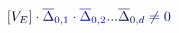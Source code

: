\documentclass[12pt]{article}
\begin{document}
\makeatletter
\renewcommand*{\@textcolor}[3]{%
  \protect\leavevmode
  \begingroup
    \color#1{#2}#3%
  \endgroup
}
\makeatother
\begin{displaymath}
\mathcolor[RGB]{0,0,15}{[} \mathcolor[RGB]{0,0,30}{V} _ { \mathcolor[RGB]{0,0,45}{E} } \mathcolor[RGB]{0,0,60}{]} \mathcolor[RGB]{0,0,75}{\cdot} {\mathcolor[RGB]{0,0,90}{\overline { \mathcolor[RGB]{0,0,105}{\Delta} } }} _ { \mathcolor[RGB]{0,0,120}{0} \mathcolor[RGB]{0,0,135}{,} \mathcolor[RGB]{0,0,150}{1} } \mathcolor[RGB]{0,0,165}{\cdot} {\mathcolor[RGB]{0,0,180}{\overline { \mathcolor[RGB]{0,0,195}{\Delta} } }} _ { \mathcolor[RGB]{0,0,210}{0} \mathcolor[RGB]{0,0,225}{,} \mathcolor[RGB]{0,0,240}{2} } \mathcolor[RGB]{0,0,255}{.} \mathcolor[RGB]{0,15,0}{.} \mathcolor[RGB]{0,15,15}{.} {\mathcolor[RGB]{0,15,30}{\overline { \mathcolor[RGB]{0,15,45}{\Delta} } }} _ { \mathcolor[RGB]{0,15,60}{0} \mathcolor[RGB]{0,15,75}{,} \mathcolor[RGB]{0,15,90}{d} } \mathcolor[RGB]{0,15,105}{\neq} \mathcolor[RGB]{0,15,120}{0}
\end{displaymath}
\end{document}
